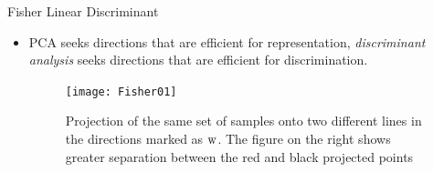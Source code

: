 \begin{frame}{Fisher Linear Discriminant}
\begin{itemize}
\item PCA seeks directions that are efficient for
representation, \textit{\color{mycolor2}discriminant analysis} seeks directions that are efficient for discrimination.
\begin{figure}
\texttt{[image: Fisher01]}
\caption{Projection of the same set of samples onto two different lines in the directions marked as ${\rm w}$. The figure on the right shows greater separation between the red and black projected points}
\end{figure}
\end{itemize}
\end{frame}


